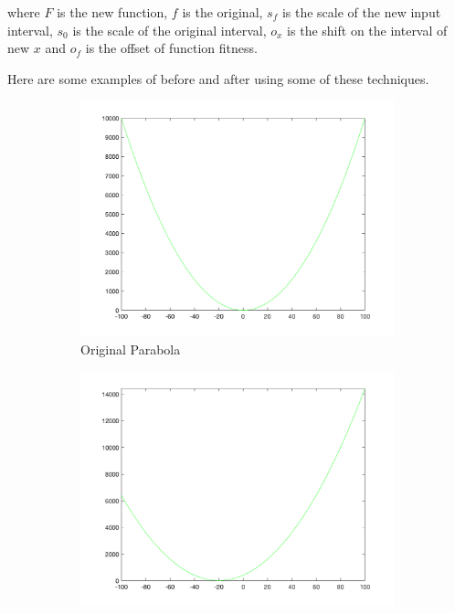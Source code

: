 where $F$ is the new function, $f$ is the original, $s_f$ is the scale of the new input interval, $s_0$ is the scale of the original interval, $o_x$ is the shift on the interval of new $x$ and $o_f$ is the offset of function fitness.

\par Here are some examples of before and after using some of these techniques.


\begin{figure}
  \centering
  \begin{subfigure}[b]{0.6\textwidth}
    \includegraphics[width=\textwidth]{img/translates/parabola/loa-graph-orig}
    \caption{Original Parabola}
  \end{subfigure}
  \begin{subfigure}[b]{0.6\textwidth}
    \includegraphics[width=\textwidth]{img/translates/parabola/loa-graph-shift}

\end{subfigure}
\end{figure}
